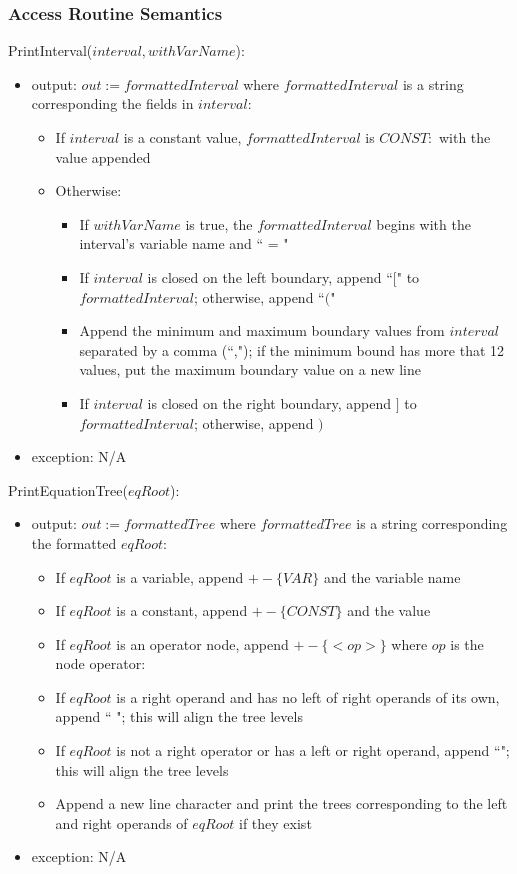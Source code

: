 \documentclass[12pt, titlepage]{article}
\begin{document}
\subsubsection{Access Routine Semantics}

\noindent PrintInterval($interval, withVarName$):
\begin{itemize}
	\item output: $out := formattedInterval$ where $formattedInterval$ is a 
	string corresponding the fields in $interval$:
	\begin{itemize}
		\item If $interval$ is a constant value, $formattedInterval$ is 
		$CONST:$ with the value appended
		\item Otherwise:
		\begin{itemize}
			\item If $withVarName$ is true, the $formattedInterval$ begins with 
			the interval's variable name and `` = "
			\item If $interval$ is closed on the left boundary, append ``$[$" 
			to $formattedInterval$; otherwise, append ``$($"
			\item Append the minimum and maximum boundary values from 
			$interval$ 
			separated by a comma (``,"); if the minimum bound has more that 12 
			values, put the maximum boundary value on a new line
			\item If $interval$ is closed on the right boundary, append $]$ to 
			$formattedInterval$; otherwise, append $)$
		\end{itemize}
	\end{itemize}
	\item exception: N/A
\end{itemize}

\noindent PrintEquationTree($eqRoot$):
\begin{itemize}
	\item output: $out := formattedTree$ where $formattedTree$ is a 
	string corresponding the formatted $eqRoot$:
	\begin{itemize}
		\item If $eqRoot$ is a variable, append $+- \{VAR\}$ and the variable 
		name
		\item If $eqRoot$ is a constant, append $+- \{CONST\}$ and the value
		\item If $eqRoot$ is an operator node, append $+- \{<op>\}$ where $op$ 
		is 
		the node operator:
		\item If $eqRoot$ is a right operand and has no left of right 
		operands of its own, append ``   "; this will align the tree levels
		\item If $eqRoot$ is not a right operator or has a left or right 
		operand, append ``\textbar ";  this will align the tree levels
		\item Append a new line character and print the trees corresponding 
		to the left and right operands of $eqRoot$ if they exist
	\end{itemize}
	\item exception: N/A
\end{itemize}
\end{document}
